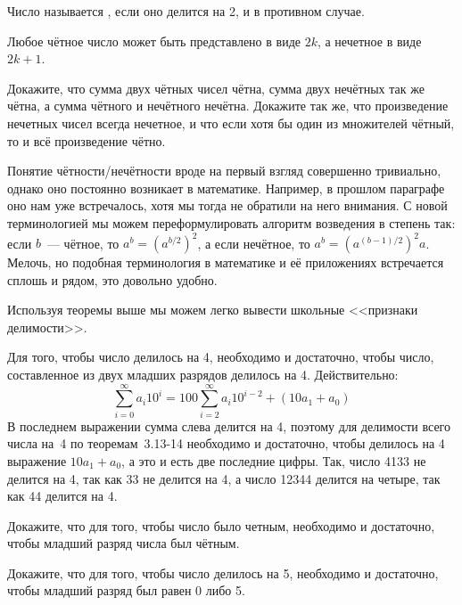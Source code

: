 \begin{definition}
Число называется , если оно делится на 2, и  в противном случае.
\end{definition}

Любое чётное число может быть представлено в виде $2k$, а нечетное в виде $2k+1$.

\begin{exercise}
Докажите, что сумма двух чётных чисел чётна, сумма двух нечётных так же чётна, а сумма чётного и нечётного нечётна. Докажите так же, что произведение нечетных чисел всегда нечетное, и что если хотя бы один из множителей чётный, то и всё произведение чётно.
\end{exercise}

Понятие чётности/нечётности вроде на первый взгляд совершенно тривиально, однако оно постоянно возникает в математике. Например, в прошлом параграфе оно нам уже встречалось, хотя мы тогда не обратили на него внимания. С новой терминологией мы можем переформулировать алгоритм возведения в степень так: если $b$~--- чётное, то $a^b = (a^{b/2})^2$, а если нечётное, то $a^b = (a^{(b-1)/2})^2 a$. Мелочь, но подобная терминология в математике и её приложениях встречается сплошь и рядом, это довольно удобно.

Используя теоремы выше мы можем легко вывести школьные <<признаки делимости>>.

\begin{example}
Для того, чтобы число делилось на 4, необходимо и достаточно, чтобы число, составленное из двух младших разрядов делилось на 4. Действительно:
$$\sum_{i=0}^\infty a_i 10^i = 100 \sum_{i = 2}^\infty a_i 10^{i-2} + (10a_1 + a_0)$$
В последнем выражении сумма слева делится на 4, поэтому для делимости всего числа на~4 по теоремам~3.13-14 необходимо и достаточно, чтобы делилось на 4 выражение $10a_1 + a_0$, а это и есть две последние цифры. Так, число 4133 не делится на 4, так как 33 не делится на 4, а число 12344 делится на четыре, так как 44 делится на 4.
\end{example}

\begin{exercise}
Докажите, что для того, чтобы число было четным, необходимо и достаточно, чтобы младший разряд числа был чётным.
\end{exercise}

\begin{exercise}
Докажите, что для того, чтобы число делилось на 5, необходимо и достаточно, чтобы младший разряд был равен 0 либо 5.
\end{exercise}

